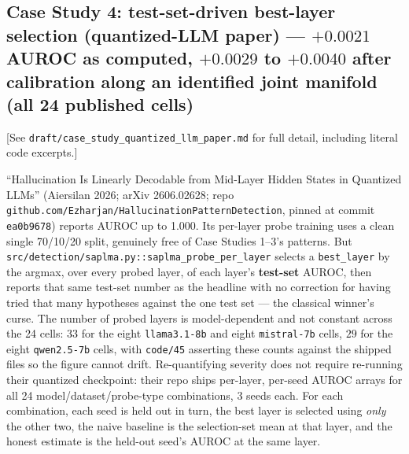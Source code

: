 \documentclass[10pt]{article} %
\begin{document}
\subsection{Case Study 4: test-set-driven best-layer selection (quantized-LLM paper) --- $+0.0021$ AUROC as computed, $+0.0029$ to $+0.0040$ after calibration along an identified joint manifold (all 24 published cells)}

[See \texttt{draft/case\_study\_quantized\_llm\_paper.md} for full detail,
including literal code excerpts.]

``Hallucination Is Linearly Decodable from Mid-Layer Hidden States in Quantized
LLMs'' (Aiersilan 2026; arXiv 2606.02628; repo
\texttt{github.com/Ezharjan/HallucinationPatternDetection}, pinned at commit
\texttt{ea0b9678}) reports AUROC up to 1.000. Its per-layer probe training uses
a clean single 70/10/20 split, genuinely free of Case Studies 1--3's patterns.
But \texttt{src/detection/saplma.py::saplma\_probe\_per\_layer} selects a
\texttt{best\_layer} by the argmax, over every probed layer, of each layer's
\textbf{test-set} AUROC, then reports that same test-set number as the headline
with no correction for having tried that many hypotheses against the one test
set --- the classical winner's curse. The number of probed layers is
model-dependent and not constant across the 24 cells: $33$ for the eight
\texttt{llama3.1-8b} and eight \texttt{mistral-7b} cells, $29$ for the eight
\texttt{qwen2.5-7b} cells, with \texttt{code/45} asserting these counts against
the shipped files so the figure cannot drift. Re-quantifying severity does not
require re-running their quantized checkpoint: their repo ships per-layer,
per-seed AUROC arrays for all 24 model/dataset/probe-type combinations, 3 seeds
each. For each combination, each seed is held out in turn, the best layer is
selected using \emph{only} the other two, the naive baseline is the
selection-set mean at that layer, and the honest estimate is the held-out
seed's AUROC at the same layer.
\end{document}
